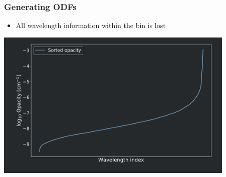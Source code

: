 \frame
{
	\frametitle{Generating ODFs}
	\begin{itemize}
		\item All wavelength information within the bin is lost
\end{itemize}		

		\centering
	\includegraphics[width=115mm]{images/odf_generation_process_2}
}

